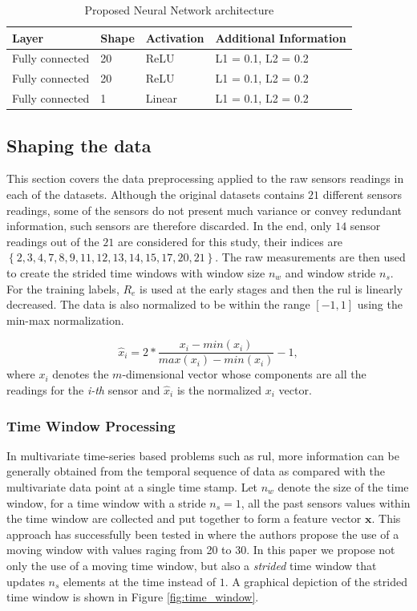 \begin{table}[!htb]
\centering
\begin{tabular}{l l l l}
	\hline
	Layer & Shape & Activation & Additional Information\\
  	\hline
  	Fully connected & 20 & ReLU & L1 = 0.1, L2 = 0.2\\
  	Fully connected & 20 & ReLU & L1 = 0.1, L2 = 0.2\\
  	Fully connected & 1 & Linear &  L1 = 0.1, L2 = 0.2\\
  	\hline
\end{tabular}
\caption{Proposed Neural Network architecture}
\label{table:proposed_nn}
\end{table}

\subsection{Shaping the data}

This section covers the data preprocessing applied to the raw sensors readings in each of the datasets. Although the original datasets contains $21$ different sensors readings, some of the sensors do not present much variance or convey redundant information, such sensors are therefore discarded. In the end, only $14$ sensor readings out of the $21$ are considered for this study, their indices are $\left\lbrace 2, 3, 4, 7, 8, 9, 11, 12, 13, 14, 15, 17, 20, 21 \right\rbrace$. The raw measurements are then used to create the strided time windows with window size $n_w$ and window stride $n_s$. For the training labels, $R_e$ is used at the early stages and then the \gls{rul} is linearly decreased. The data is also normalized to be within the range $\left[ -1,1 \right]$ using the min-max normalization.

\begin{equation}
\hat{x}_i = 2* \frac{x_i - min(x_i)}{max(x_i) - min(x_i)} - 1,
\label{eq:min_max_norm}
\end{equation}
where $x_i$ denotes the $m$-dimensional vector whose components are all the readings for the \textit{i-th} sensor and $\hat{x}_i$ is the normalized $x_i$ vector.

\subsubsection{Time Window Processing}

In multivariate time-series based problems such as \gls{rul}, more information can be generally obtained from the temporal sequence of data as compared with the multivariate data point at a single time stamp. Let $n_w$ denote the size of the time window, for a time window with a stride $n_s = 1$, all the past sensors values within the time window are collected and put together to form a feature vector $\mathbf{x}$. This approach has successfully been tested in \cite{Li2018, Lim2016} where the authors propose the use of a moving window with values raging from 20 to 30. In this paper we propose not only the use of a moving time window, but also a \textit{strided} time window that updates $n_s$ elements at the time instead of $1$. A graphical depiction of the strided time window is shown in Figure \ref{fig:time_window}.

